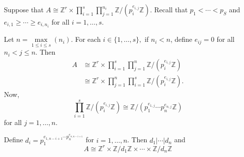 \documentclass{article}
\begin{document}
Suppose that $A \cong \mathbb{Z}^r \times \prod_{i=1}^s \prod_{j=1}^{n_i} \mathbb{Z}/(p_i^{e_{i,j}}\mathbb{Z})$. Recall that $p_1<\cdots < p_S$ and $e_{i,1}\ge \cdots \ge e_{i,n_i}$ for all $i=1,\dots, s$.

Let $n=\underset{1\le i \le s}{\max}(n_i)$. For each $i\in \{1,\dots, s\},$ if $n_i < n$, define $e_{ij}=0$ for all $n_i < j \le n$. Then
\begin{align*}
    A &\cong \mathbb{Z}^r \times \prod_{i=1}^s \prod_{j=1}^n \mathbb{Z}/(p_i^{e_{i,j}}\mathbb{Z}) \\ 
    &\cong \mathbb{Z}^r \times \prod_{j=1}^n \prod_{i=1}^s \mathbb{Z}/(p_i^{e_{i,j}}\mathbb{Z}). 
\end{align*}
Now,
\begin{equation*}
    \prod_{i=1}^s \mathbb{Z}/(p_i^{e_{i,j}}\mathbb{Z}) \cong \mathbb{Z}/(p_1^{e_{1,j}}\cdots p_n^{e_{n,j}}\mathbb{Z})
\end{equation*}
for all $j=1,\dots, n$.

Define $d_i = p_1^{e_{1,n-i+1}\cdots p_n^{e_{n,n-i+1}}}$ for $i=1,\dots, n$. Then $d_1|\cdots | d_n$ and
\begin{equation*}
    A \cong \mathbb{Z}^r \times \mathbb{Z}/d_1\mathbb{Z} \times \cdots \times \mathbb{Z}/d_n\mathbb{Z}
\end{equation*}
\end{document}
